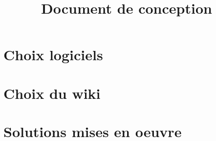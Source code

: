 \documentclass{article}
\begin{document}
\section{Choix logiciels}


\title{Document de conception}

\section{Choix du wiki}


\section{Solutions mises en oeuvre}
\end{document}
